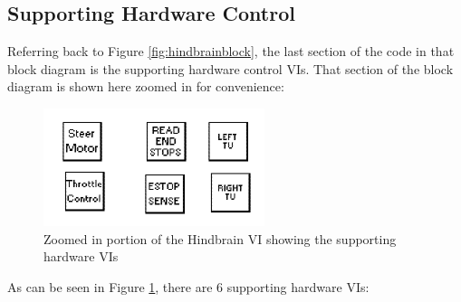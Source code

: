 \subsection{Supporting Hardware Control}

Referring back to Figure \ref{fig:hindbrainblock}, the last section of the code in that block diagram is the supporting hardware control VIs. That section of the block diagram is shown here zoomed in for convenience:

\begin{figure}[h!]
\centering
\includegraphics[scale=2.0]{Photos/supportinghardwarevis.png}
\caption{Zoomed in portion of the Hindbrain VI showing the supporting hardware VIs}
\label{fig:supportinghardwarevis}
\end{figure}

\noindent As can be seen in Figure \ref{fig:supportinghardwarevis}, there are 6 supporting hardware VIs:

